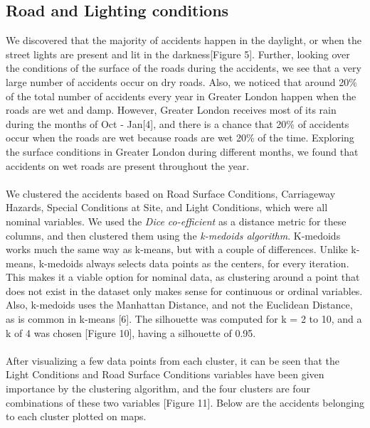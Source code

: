 \documentclass[a4paper, 11pt]{article}
\begin{document}
\subsection{Road and Lighting conditions}

We discovered that the majority of accidents happen in the daylight, or when the street lights are present and lit in the darkness[Figure 5]. Further, looking over the conditions of the surface of the roads during the accidents, we see that a very large number of accidents occur on dry roads. Also, we noticed that around 20\% of the total number of accidents every year in Greater London happen when the roads are wet and damp. However, Greater London receives most of its rain during the months of Oct - Jan[4], and there is a chance that 20\% of accidents occur when the roads are wet because roads are wet 20\% of the time. Exploring the surface conditions in Greater London during different months, we found that accidents on wet roads are present throughout the year.\\ \\

We clustered the accidents based on Road Surface Conditions, Carriageway Hazards, Special Conditions at Site, and Light Conditions, which were all nominal variables. We used the \textit{Dice co-efficient} as a distance metric for these columns, and then clustered them using the \textit{k-medoids algorithm}. K-medoids works much the same way as k-means, but with a couple of differences. Unlike k-means, k-medoids always selects data points as the centers, for every iteration. This makes it a viable option for nominal data, as clustering around a point that does not exist in the dataset only makes sense for continuous or ordinal variables. Also, k-medoids uses the Manhattan Distance, and not the Euclidean Distance, as is common in k-means [6]. The silhouette was computed for k = 2 to 10, and a k of 4 was chosen [Figure 10], having a silhouette of 0.95. \\ \\

After visualizing a few data points from each cluster, it can be seen that the Light Conditions and Road Surface Conditions variables have been given importance by the clustering algorithm, and the four clusters are four combinations of these two variables [Figure 11]. Below are the accidents belonging to each cluster plotted on maps. \\ \\
\end{document}
